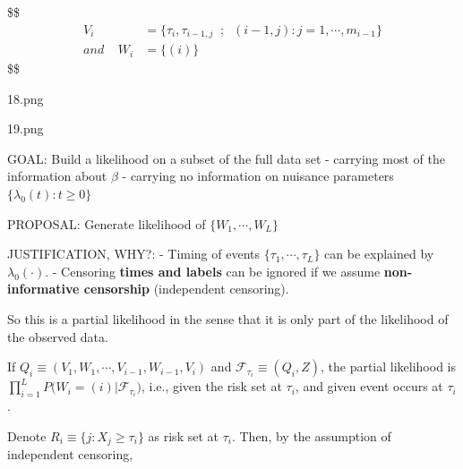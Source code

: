 \documentclass[
]{book}
\theoremstyle{definition}
\theoremstyle{definition}
\theoremstyle{definition}
\theoremstyle{definition}
\theoremstyle{remark}
\begin{document}
\$\$
\begin{align}
V_i &= \Big \{ \tau_i , \tau_{i-1, j}  \; \; ; \; \; (i-1, j):j = 1, \cdots, m_{i-1} \Big \}

\\

and \; \; \; \;W_i &= \Big \{ (i) \Big \}


\end{align}
\$\$

18.png

19.png

GOAL: Build a likelihood on a subset of the full data set
- carrying most of the information about \(\beta\)
- carrying no information on nuisance parameters \(\Big \{ \lambda_0 (t) : t \ge 0 \Big \}\)

PROPOSAL: Generate likelihood of \(\Big \{ W_1, \cdots, W_L \Big \}\)

JUSTIFICATION, WHY?:
- Timing of events \(\Big \{ \tau_1 , \cdots, \tau_L \Big \}\) can be explained by \(\lambda_0(\cdot)\).
- Censoring \textbf{times and labels} can be ignored if we assume \textbf{non-informative censorship} (independent censoring).

So this is a partial likelihood in the sense that it is only part of the likelihood of the observed data.

If \(Q_i \equiv (V_1, W_1 , \cdots, V_{i-1}, W_{i-1}, V_i)\) and \(\mathcal F_{\tau_i} \equiv (Q_i, Z)\), the partial likelihood is \(\prod_{i=1}^L P \Big ( W_i = (i) \Big | \mathcal F_{\tau_i} \Big)\), i.e., given the risk set at \(\tau_i\), and given event occurs at \(\tau_i\).

Denote \(R_i \equiv \Big \{ j : X_j \ge \tau_i \Big \}\) as risk set at \(\tau_i\). Then, by the assumption of independent censoring,
\end{document}

